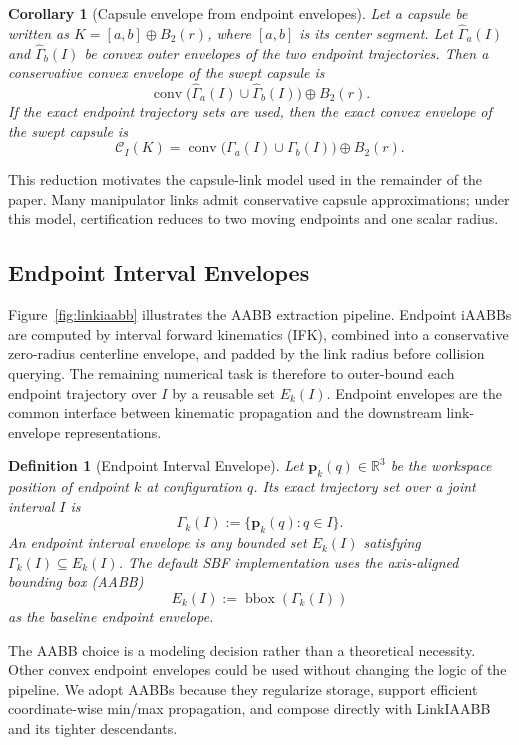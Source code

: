 \documentclass[journal]{IEEEtran}
\DeclareRobustCommand{\textsc}[1]{\textnormal{\MakeUppercase{#1}}}
\newtheorem{definition}{Definition}
\newtheorem{corollary}{Corollary}
\newcommand{\sbf}{\textsc{SBF}}
\newcommand{\iAABB}{\ensuremath{\mathrm{iAABB}}}
\newcommand{\Real}{\ensuremath{\mathbb{R}}}
\begin{document}
\begin{corollary}[Capsule envelope from endpoint envelopes]
\label{cor:capsule_lift}
Let a capsule be written as $K=[a,b]\oplus B_2(r)$, where $[a,b]$ is its center
segment. Let $\widehat{\Gamma}_a(I)$ and $\widehat{\Gamma}_b(I)$ be convex outer
envelopes of the two endpoint trajectories. Then a conservative convex envelope
of the swept capsule is
\[
\operatorname{conv}\bigl(\widehat{\Gamma}_a(I) \cup
\widehat{\Gamma}_b(I)\bigr) \oplus B_2(r).
\]
If the exact endpoint trajectory sets are used, then the exact convex envelope
of the swept capsule is
\[
\mathcal{C}_I(K)
= \operatorname{conv}\bigl(\Gamma_a(I) \cup \Gamma_b(I)\bigr)
\oplus B_2(r).
\]
\end{corollary}

This reduction motivates the capsule-link model used in the remainder of the
paper. Many manipulator links admit conservative capsule approximations; under
this model, certification reduces to two moving endpoints and one scalar
radius.

\subsection{Endpoint Interval Envelopes}\label{sec:rewrite_endpoint_env}

\noindent Figure~\ref{fig:linkiaabb} illustrates the AABB extraction pipeline.
Endpoint \iAABB{}s are computed by interval forward kinematics (IFK), combined
into a conservative zero-radius centerline envelope, and padded by the link
radius before collision querying. The remaining numerical task is therefore to
outer-bound each endpoint trajectory over $I$ by a reusable set $E_k(I)$.
Endpoint envelopes are the common interface between kinematic propagation and
the downstream link-envelope representations.

\begin{definition}[Endpoint Interval Envelope]\label{def:endpoint_env}
Let $\bm{p}_k(q) \in \Real^3$ be the workspace position of endpoint $k$ at
configuration $q$. Its exact trajectory set over a joint interval $I$ is
\[
\Gamma_k(I) := \{\bm{p}_k(q) : q\in I\}.
\]
An endpoint interval envelope is any bounded set $E_k(I)$ satisfying
$\Gamma_k(I) \subseteq E_k(I)$. The default \sbf{} implementation uses the
axis-aligned bounding box (AABB)
\[
E_k(I) := \operatorname{bbox}(\Gamma_k(I))
\]
as the baseline endpoint envelope.
\end{definition}

The AABB choice is a modeling decision rather than a theoretical necessity.
Other convex endpoint envelopes could be used without changing the logic of the
pipeline. We adopt AABBs because they regularize storage, support efficient
coordinate-wise min/max propagation, and compose directly with LinkIAABB and
its tighter descendants.
\end{document}
